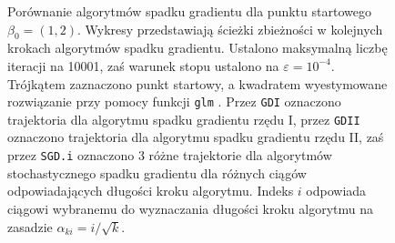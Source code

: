 \begin{figure}[hbt!]
  \caption[Porównanie algorytmów spadku gradientu dla punktu startowego $\beta_0 = (1,2)$.]{\label{fig:sc2asd}Porównanie algorytmów spadku gradientu dla punktu startowego $\beta_0 = (1,2)$. Wykresy przedstawiają ścieżki zbieżności w kolejnych krokach algorytmów spadku gradientu. Ustalono maksymalną liczbę iteracji na 10001, zaś warunek stopu ustalono na $\varepsilon=10^{-4}$. Trójkątem zaznaczono punkt startowy, a kwadratem wyestymowane rozwiązanie przy pomocy funkcji \texttt{glm} \cite{glmglm}. Przez \texttt{GDI} oznaczono trajektoria dla algorytmu spadku gradientu rzędu I, przez \texttt{GDII} oznaczono trajektoria dla algorytmu spadku gradientu rzędu II, zaś przez \texttt{SGD.i} oznaczono 3 różne trajektorie dla algorytmów stochastycznego spadku gradientu dla różnych ciągów odpowiadających długości kroku algorytmu. Indeks $i$ odpowiada ciągowi wybranemu do wyznaczania długości kroku algorytmu na zasadzie $\alpha_{ki} = i/\sqrt{k}$.}
\end{figure}


